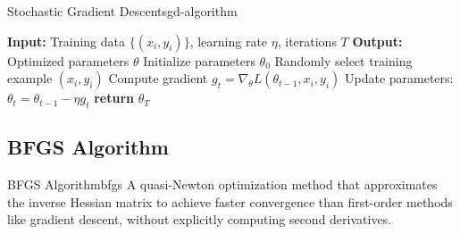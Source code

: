 \documentclass[12pt]{article}
\begin{document}
\begin{algorithmenv}{Stochastic Gradient Descent}{sgd-algorithm}
\begin{algorithmic}[1]
\State \textbf{Input:} Training data $\{(x_i, y_i)\}$, learning rate $\eta$, iterations $T$
\State \textbf{Output:} Optimized parameters $\theta$
\State Initialize parameters $\theta_0$
    \State Randomly select training example $(x_i, y_i)$
    \State Compute gradient $g_t = \nabla_\theta L(\theta_{t-1}, x_i, y_i)$
    \State Update parameters: $\theta_t = \theta_{t-1} - \eta g_t$
\EndFor
\State \textbf{return} $\theta_T$
\end{algorithmic}
\end{algorithmenv}



\subsection{BFGS Algorithm}

\begin{definition}{BFGS Algorithm}{bfgs}
A quasi-Newton optimization method that approximates the inverse Hessian matrix to achieve faster convergence than first-order methods like gradient descent, without explicitly computing second derivatives.
\end{definition}
\end{document}

